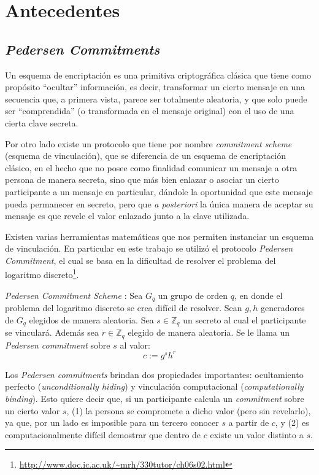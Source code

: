 \chapter{Antecedentes}\label{cap2}
\section{\emph{Pedersen Commitments}}

Un esquema de encriptación es una primitiva criptográfica clásica que tiene 
como propósito ``ocultar'' información, es decir, transformar un cierto 
mensaje en una secuencia que, a primera vista, parece ser totalmente 
aleatoria, y que solo puede ser ``comprendida'' (o transformada en el 
mensaje original) con el uso de una cierta clave secreta.

Por otro lado existe un protocolo que tiene por nombre 
\emph{commitment scheme} (esquema de vinculación), que se diferencia de un 
esquema de encriptación clásico, en el hecho que no posee como 
finalidad comunicar un mensaje a otra persona de manera secreta, sino que más 
bien enlazar o asociar un cierto participante a un mensaje en particular, 
dándole la oportunidad que este mensaje pueda permanecer en secreto, pero que 
\emph{a posteriori} la única manera de aceptar su 
mensaje es que revele el valor enlazado junto a la clave utilizada.

Existen varias herramientas matemáticas que nos permiten instanciar un 
esquema de vinculación. En particular en este 
trabajo se utilizó el protocolo 
\emph{Pedersen Commitment}\cite{pedersen1991non}, el cual se basa en la 
dificultad de resolver el problema del logaritmo 
discreto\footnote{\url{http://www.doc.ic.ac.uk/~mrh/330tutor/ch06s02.html}}.

\emph{Pedersen Commitment Scheme} \cite{pedersen1991non}: Sea $G_q$ un grupo 
de orden $q$, en donde el problema del logaritmo discreto se crea difícil 
de resolver. Sean $g,h$ generadores de $G_q$ elegidos de manera aleatoria. Sea 
$s \in \mathbb{Z}_q$ un secreto al cual el participante se vinculará. 
Además sea $r \in \mathbb{Z}_q$ elegido de manera aleatoria. Se le 
llama un \emph{Pedersen commitment} sobre $s$ al valor: $$c := g^s h^r$$

Los \emph{Pedersen commitments} brindan dos propiedades importantes:  
ocultamiento perfecto (\emph{unconditionally hiding}) y 
vinculación computacional (\emph{computationally binding}). 
Esto quiere decir que, si un participante calcula un \emph{commitment} sobre 
un cierto valor $s$, (1) la persona se compromete a dicho valor (pero sin 
revelarlo), ya que, por un lado es imposible para un tercero conocer $s$ a 
partir de $c$, y (2) es computacionalmente difícil demostrar que dentro de $c$ 
existe un valor distinto a $s$.

